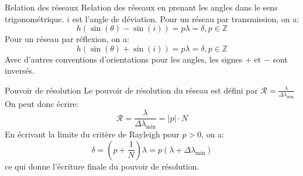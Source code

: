 \documentclass[french, a4paper, 11pt, twocolumn]{article}
\newcommand{\Z}{\mathbb{Z}}   %
\newcommand{\po}{\left(}         %
\newcommand{\pf}{\right)}        %
\newcommand{\pof}[1]{\po #1 \pf} %
\begin{document}
\begin{cadre}{Relation des réseaux}
  Relation des réseaux en prenant les angles dans le sens trigonométrique. \(i\) est l'angle de déviation.
  Pour un réseau par transmission, on a:
  \[h(\sin(\theta)-\sin(i))=p\lambda=\delta, p \in \Z\]
  Pour un réseau par réflexion, on a:
  \[h(\sin(\theta)+\sin(i))=p\lambda=\delta, p \in \Z\]
  \tcblower
  Avec d'autres conventions d'orientations pour les angles, les signes \og \(+\)\fg{} et \og \(-\)\fg{} sont inversés.
\end{cadre}

\begin{cadre}{Pouvoir de résolution}
  Le pouvoir de résolution du réseau est défini par
  \(\mathcal{R}=\frac{\lambda}{\Delta\lambda_{\text{min}}}\)
  On peut donc écrire:
  \[\mathcal{R}=\frac{\lambda}{\Delta\lambda_{\text{min}}}=\lvert p\rvert\cdot N\]
  \tcblower
  En écrivant la limite du critère de Rayleigh pour \(p>0\), on a:
  \[\delta=\pof{p+\frac{1}{N}}\lambda=p\pof{\lambda + \Delta\lambda_{\text{min}}}\]
  ce qui donne l'écriture finale du pouvoir de résolution.
\end{cadre}
\end{document}
